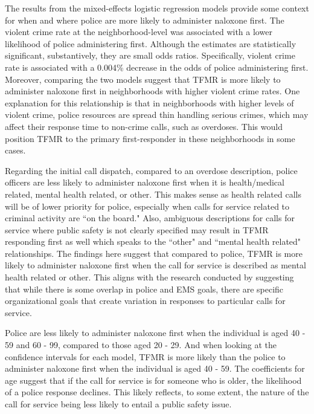 The results from the mixed-effects logistic regression models provide some context for when and where police are more likely to administer naloxone first. The violent crime rate at the neighborhood-level was associated with a lower likelihood of police administering first. Although the estimates are statistically significant, substantively, they are small odds ratios. Specifically, violent crime rate is associated with a 0.004\% decrease in the odds of police administering first. Moreover, comparing the two models suggest that TFMR is more likely to administer naloxone first in neighborhoods with higher violent crime rates. One explanation for this relationship is that in neighborhoods with higher levels of violent crime, police resources are spread thin handling serious crimes, which may affect their response time to non-crime calls, such as overdoses. This would position TFMR to the primary first-responder in these neighborhoods in some cases. 

Regarding the initial call dispatch, compared to an overdose description, police officers are less likely to administer naloxone first when it is health/medical related, mental health related, or other. This makes sense as health related calls will be of lower priority for police, especially when calls for service related to criminal activity are ``on the board." Also, ambiguous descriptions for calls for service where public safety is not clearly specified may result in TFMR responding first as well which speaks to the ``other" and ``mental health related" relationships. The findings here suggest that compared to police, TFMR is more likely to administer naloxone first when the call for service is described as mental health related or other. This aligns with the research conducted by \textcite{seim_bandage_2020} suggesting that while there is some overlap in police and EMS goals, there are specific organizational goals that create variation in responses to particular calls for service. 

Police are less likely to administer naloxone first when the individual is aged 40 - 59 and 60 - 99, compared to those aged 20 - 29. And when looking at the confidence intervals for each model, TFMR is more likely than the police to administer naloxone first when the individual is aged 40 - 59. The coefficients for age suggest that if the call for service is for someone who is older, the likelihood of a police response declines. This likely reflects, to some extent, the nature of the call for service being less likely to entail a public safety issue. 

